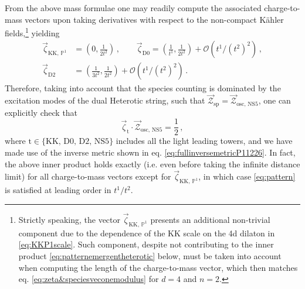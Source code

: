 From the above mass formulae one may readily compute the associated charge-to-mass vectors upon taking derivatives with respect to the non-compact K\"ahler fields,\footnote{Strictly speaking, the vector $\vec{\zeta}_{\text{KK},\, \mathbb{P}^1}$ presents an additional non-trivial component due to the dependence of the KK scale on the 4d dilaton in \eqref{eq:KKP1scale}. Such component, despite not contributing to the inner product \eqref{eq:patternemergentheterotic} below, must be taken into account when computing the length of the charge-to-mass vector, which then matches eq. \eqref{eq:zeta&speciesveconemodulus} for $d=4$ and $n=2$.} yielding
%
\begin{equation}\label{eq:zetavectorsn=1}
\begin{aligned}
	\vec{\zeta}_{\text{KK},\, \mathbb{P}^1} &= \left( 0, \frac{1}{2 t^2} \right)\, , \qquad \vec{\zeta}_{\text{D0}} = \left( \frac{1}{t^1}, \frac{1}{2 t^2} \right) + \mathcal{O}\left( t^1/(t^2)^2\right)\, ,\\
    \vec{\zeta}_{\text{D2}} &= \left( \frac{1}{3t^2}, \frac{1}{2 t^2} \right) + \mathcal{O}\left( t^1/(t^2)^2\right)\, .
\end{aligned}
\end{equation}
%
Therefore, taking into account that the species counting is dominated by the excitation modes of the dual Heterotic string, such that $\vec{\mathcal{Z}}_{\text{sp}}=\vec{\mathcal{Z}}_{\text{osc, NS5}}$, one can explicitly check that
%
\begin{equation}\label{eq:patternemergentheterotic}
	\vec{\zeta}_{\text{t}} \cdot \vec{\mathcal{Z}}_{\text{osc, NS5}} = \frac{1}{2}\, ,
\end{equation}
%
where $\text{t}\in \lbrace \text{KK, D0, D2, NS5} \rbrace $ includes all the light leading towers, and we have made use of the inverse metric shown in eq. \eqref{eq:fullinversemetricP11226}. In fact, the above inner product holds exactly (i.e. even before taking the infinite distance limit) for all charge-to-mass vectors except for $\vec{\zeta}_{\text{KK},\, \mathbb{P}^1}$, in which case \eqref{eq:pattern} is satisfied at leading order in $t^1/t^2$.
	

